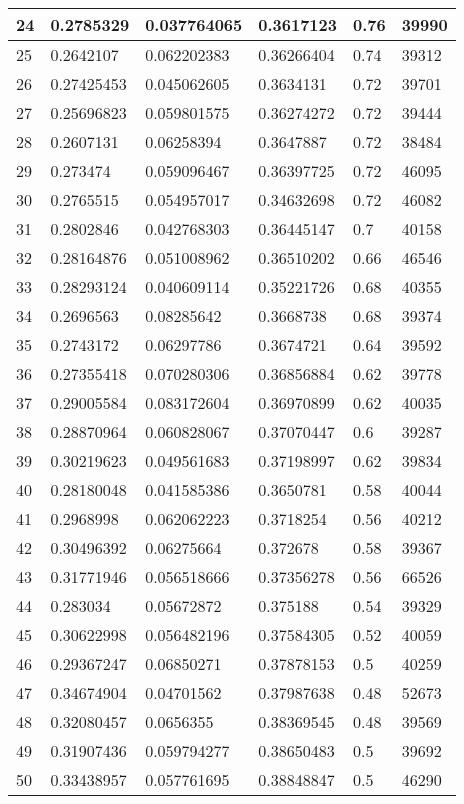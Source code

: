 \begin{longtable}{|l|l|l|l|l|l|}
24 & 0.2785329 & 0.037764065 & 0.3617123 & 0.76 & 39990 \\ \hline 
25 & 0.2642107 & 0.062202383 & 0.36266404 & 0.74 & 39312 \\ \hline 
26 & 0.27425453 & 0.045062605 & 0.3634131 & 0.72 & 39701 \\ \hline 
27 & 0.25696823 & 0.059801575 & 0.36274272 & 0.72 & 39444 \\ \hline 
28 & 0.2607131 & 0.06258394 & 0.3647887 & 0.72 & 38484 \\ \hline 
29 & 0.273474 & 0.059096467 & 0.36397725 & 0.72 & 46095 \\ \hline 
30 & 0.2765515 & 0.054957017 & 0.34632698 & 0.72 & 46082 \\ \hline 
31 & 0.2802846 & 0.042768303 & 0.36445147 & 0.7 & 40158 \\ \hline 
32 & 0.28164876 & 0.051008962 & 0.36510202 & 0.66 & 46546 \\ \hline 
33 & 0.28293124 & 0.040609114 & 0.35221726 & 0.68 & 40355 \\ \hline 
34 & 0.2696563 & 0.08285642 & 0.3668738 & 0.68 & 39374 \\ \hline 
35 & 0.2743172 & 0.06297786 & 0.3674721 & 0.64 & 39592 \\ \hline 
36 & 0.27355418 & 0.070280306 & 0.36856884 & 0.62 & 39778 \\ \hline 
37 & 0.29005584 & 0.083172604 & 0.36970899 & 0.62 & 40035 \\ \hline 
38 & 0.28870964 & 0.060828067 & 0.37070447 & 0.6 & 39287 \\ \hline 
39 & 0.30219623 & 0.049561683 & 0.37198997 & 0.62 & 39834 \\ \hline 
40 & 0.28180048 & 0.041585386 & 0.3650781 & 0.58 & 40044 \\ \hline 
41 & 0.2968998 & 0.062062223 & 0.3718254 & 0.56 & 40212 \\ \hline 
42 & 0.30496392 & 0.06275664 & 0.372678 & 0.58 & 39367 \\ \hline 
43 & 0.31771946 & 0.056518666 & 0.37356278 & 0.56 & 66526 \\ \hline 
44 & 0.283034 & 0.05672872 & 0.375188 & 0.54 & 39329 \\ \hline 
45 & 0.30622998 & 0.056482196 & 0.37584305 & 0.52 & 40059 \\ \hline 
46 & 0.29367247 & 0.06850271 & 0.37878153 & 0.5 & 40259 \\ \hline 
47 & 0.34674904 & 0.04701562 & 0.37987638 & 0.48 & 52673 \\ \hline 
48 & 0.32080457 & 0.0656355 & 0.38369545 & 0.48 & 39569 \\ \hline 
49 & 0.31907436 & 0.059794277 & 0.38650483 & 0.5 & 39692 \\ \hline 
50 & 0.33438957 & 0.057761695 & 0.38848847 & 0.5 & 46290 \\ \hline 
\end{longtable}